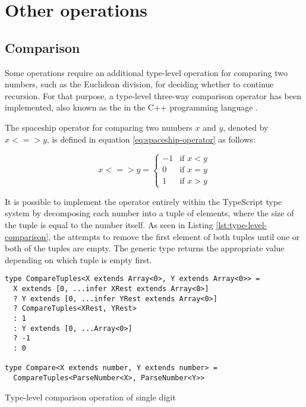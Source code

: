 \section{Other operations}

\subsection{Comparison}

Some operations require an additional type-level operation for comparing two numbers, such as the Euclidean division, for deciding whether to continue recursion. For that purpose, a type-level three-way comparison operator has been implemented, also known as the  in the C++ programming language \cite{sutterConsistentComparison2017}.

The spaceship operator for comparing two numbers $x$ and $y$, denoted by $x <=> y$, is defined in equation \ref{eq:spaceship-operator} as follows:

\begin{equation}\label{eq:spaceship-operator}
  x <=> y =
  \begin{cases}
    -1 & \text{if } x < y \\
    0  & \text{if } x = y \\
    1  & \text{if } x > y
  \end{cases}
\end{equation}

It is possible to implement the operator entirely within the TypeScript type system by decomposing each number into a tuple of elements, where the size of the tuple is equal to the number itself. As seen in Listing \ref{lst:type-level-comparison}, the  attempts to remove the first element of both tuples until one or both of the tuples are empty. The generic type returns the appropriate value depending on which tuple is empty first.

\begin{listing}[ht]
  \begin{verbatim}
type CompareTuples<X extends Array<0>, Y extends Array<0>> =
  X extends [0, ...infer XRest extends Array<0>]
  ? Y extends [0, ...infer YRest extends Array<0>]
  ? CompareTuples<XRest, YRest>
  : 1
  : Y extends [0, ...Array<0>]
  ? -1
  : 0

type Compare<X extends number, Y extends number> =
  CompareTuples<ParseNumber<X>, ParseNumber<Y>>
\end{verbatim}
  \caption{Type-level comparison operation of single digit}\label{lst:type-level-comparison}
\end{listing}

